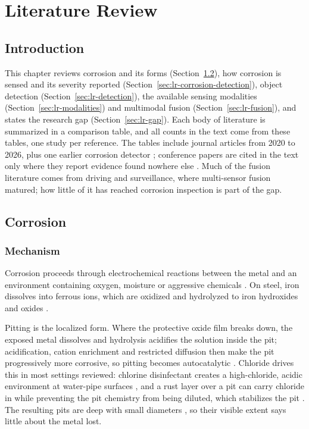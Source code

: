 \providecommand{\cmY}{$\checkmark$}
\providecommand{\cmN}{$\times$}
\chapter[LITERATURE REVIEW]{Literature Review}
\label{ch:literature-review}

\section{Introduction}
\label{sec:lr-introduction}

This chapter reviews corrosion and its forms
(Section~\ref{sec:lr-corrosion}), how corrosion is sensed and its severity
reported (Section~\ref{sec:lr-corrosion-detection}), object detection
(Section~\ref{sec:lr-detection}), the available sensing modalities
(Section~\ref{sec:lr-modalities}) and multimodal fusion
(Section~\ref{sec:lr-fusion}), and states the research gap
(Section~\ref{sec:lr-gap}). Each body of literature is summarized in a
comparison table, and all counts in the text come from these tables, one study
per reference. The tables include journal articles from 2020 to 2026, plus one
earlier corrosion detector \citep{Yao2019}; conference papers are cited in the
text only where they report evidence found nowhere else
\citep{Soares2023,Ding2025,Zheng2025,Haitz2022,Mota2024}. Much of the fusion
literature comes from driving and surveillance, where multi-sensor fusion
matured; how little of it has reached corrosion inspection is part of the gap.

\section{Corrosion}
\label{sec:lr-corrosion}

\subsection{Mechanism}

Corrosion proceeds through electrochemical reactions between the metal and an
environment containing oxygen, moisture or aggressive chemicals
\citep{Alvani2026}. On steel, iron dissolves into ferrous ions, which are
oxidized and hydrolyzed to iron hydroxides and oxides \citep{Liu2026}.

Pitting is the localized form. Where the protective oxide film breaks down, the
exposed metal dissolves and hydrolysis acidifies the solution inside the pit;
acidification, cation enrichment and restricted diffusion then make the pit
progressively more corrosive, so pitting becomes autocatalytic \citep{Liu2026}.
Chloride drives this in most settings reviewed: chlorine disinfectant creates a
high-chloride, acidic environment at water-pipe surfaces \citep{Li2022}, and a
rust layer over a pit can carry chloride in while preventing the pit chemistry
from being diluted, which stabilizes the pit \citep{Nguyen2026}. The resulting
pits are deep with small diameters \citep{Soares2023}, so their visible extent
says little about the metal lost.

